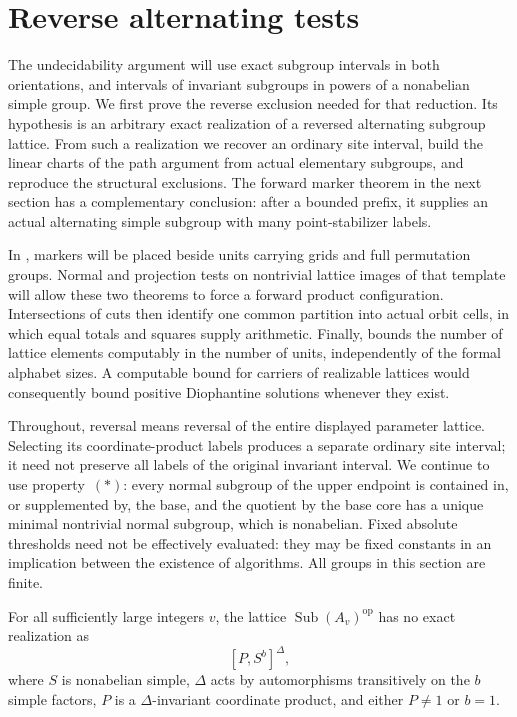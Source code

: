 \section{Reverse alternating tests}\label{sec:reverse}

The undecidability argument will use exact subgroup intervals in both
orientations, and intervals of invariant subgroups in powers of a
nonabelian simple group.  We first prove the reverse exclusion needed for
that reduction.  Its hypothesis is an arbitrary exact realization of a
reversed alternating subgroup lattice.  From such a realization we recover
an ordinary site interval, build the linear charts of the path argument
from actual elementary subgroups, and reproduce the structural exclusions.
The forward marker theorem in the next section has a complementary
conclusion: after a bounded prefix, it supplies an actual alternating
simple subgroup with many point-stabilizer labels.

In , markers will be placed beside units carrying grids
and full permutation groups.  Normal and projection tests on nontrivial
lattice images of that template will allow these two theorems to force a
forward product configuration.  Intersections of cuts then identify one
common partition into actual orbit cells, in which equal totals and
squares supply arithmetic.  Finally,  bounds the number
of lattice elements computably in the number of units, independently of
the formal alphabet sizes.  A computable bound for carriers of realizable
lattices would consequently bound positive Diophantine solutions whenever
they exist.

Throughout, reversal means reversal of the entire displayed parameter
lattice.  Selecting its coordinate-product labels produces a separate
ordinary site interval; it need not preserve all labels of the original
invariant interval.  We continue to use property~\((*)\): every normal
subgroup of the upper endpoint is contained in, or supplemented by, the
base, and the quotient by the base core has a unique minimal nontrivial
normal subgroup, which is nonabelian.  Fixed absolute thresholds need not
be effectively evaluated: they may be fixed constants in an implication
between the existence of algorithms.  All groups in this section are
finite.

\begin{theorem}\label{r:reverse-exclusion}
For all sufficiently large integers $v$, the lattice
$\operatorname{Sub}(A_v)^{\mathrm{op}}$ has no exact realization as
\[
 [P,S^b]^\Delta,
\]
where $S$ is nonabelian simple, $\Delta$ acts by automorphisms transitively
on the $b$ simple factors, $P$ is a $\Delta$-invariant coordinate product,
and either $P\ne1$ or $b=1$.
\end{theorem}

